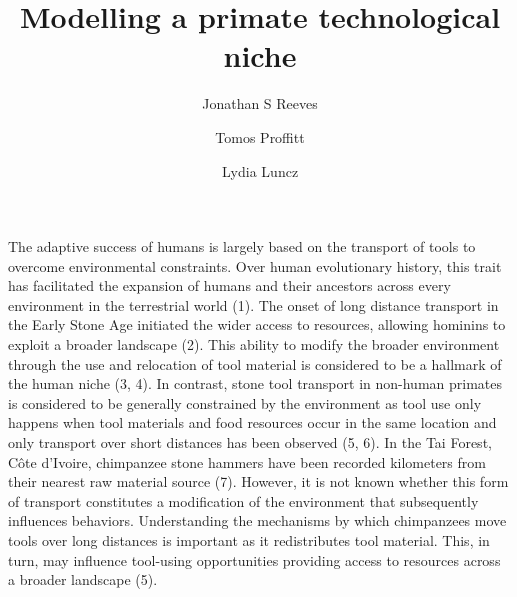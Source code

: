 \documentclass[9pt,twocolumn,twoside,]{pnas-new}
\title{Modelling a primate technological niche}
\author[a]{Jonathan S Reeves}
\author[a]{Tomos Proffitt}
\author[a]{Lydia Luncz}
\affil[a]{Max Planck Institute for Evolutionary Anthropology,
Technological Primate Research Group, Deutscher Platz 6., Leipzig,
Germany, 04103}
\begin{document}
\verticaladjustment{-2pt}

\maketitle
\thispagestyle{firststyle}



The adaptive success of humans is largely based on the transport of
tools to overcome environmental constraints. Over human evolutionary
history, this trait has facilitated the expansion of humans and their
ancestors across every environment in the terrestrial world (1). The
onset of long distance transport in the Early Stone Age initiated the
wider access to resources, allowing hominins to exploit a broader
landscape (2). This ability to modify the broader environment through
the use and relocation of tool material is considered to be a hallmark
of the human niche (3, 4). In contrast, stone tool transport in
non-human primates is considered to be generally constrained by the
environment as tool use only happens when tool materials and food
resources occur in the same location and only transport over short
distances has been observed (5, 6). In the Tai Forest, Côte d'Ivoire,
chimpanzee stone hammers have been recorded kilometers from their
nearest raw material source (7). However, it is not known whether this
form of transport constitutes a modification of the environment that
subsequently influences behaviors. Understanding the mechanisms by which
chimpanzees move tools over long distances is important as it
redistributes tool material. This, in turn, may influence tool-using
opportunities providing access to resources across a broader landscape
(5).
\end{document}
